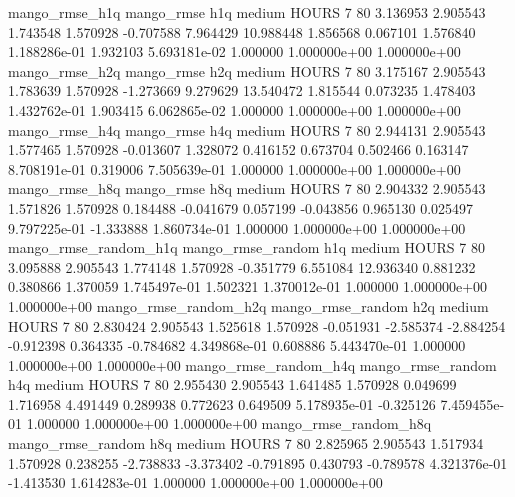        mango_rmse_h1q        mango_rmse                  h1q     medium    HOURS                 7 80  3.136953       2.905543 1.743548       1.570928   -0.707588      7.964429     10.988448     1.856568       0.067101  1.576840 1.188286e-01     1.932103   5.693181e-02            1.000000    1.000000e+00        1.000000e+00
       mango_rmse_h2q        mango_rmse                  h2q     medium    HOURS                 7 80  3.175167       2.905543 1.783639       1.570928   -1.273669      9.279629     13.540472     1.815544       0.073235  1.478403 1.432762e-01     1.903415   6.062865e-02            1.000000    1.000000e+00        1.000000e+00
       mango_rmse_h4q        mango_rmse                  h4q     medium    HOURS                 7 80  2.944131       2.905543 1.577465       1.570928   -0.013607      1.328072      0.416152     0.673704       0.502466  0.163147 8.708191e-01     0.319006   7.505639e-01            1.000000    1.000000e+00        1.000000e+00
       mango_rmse_h8q        mango_rmse                  h8q     medium    HOURS                 7 80  2.904332       2.905543 1.571826       1.570928    0.184488     -0.041679      0.057199    -0.043856       0.965130  0.025497 9.797225e-01    -1.333888   1.860734e-01            1.000000    1.000000e+00        1.000000e+00
mango_rmse_random_h1q mango_rmse_random                  h1q     medium    HOURS                 7 80  3.095888       2.905543 1.774148       1.570928   -0.351779      6.551084     12.936340     0.881232       0.380866  1.370059 1.745497e-01     1.502321   1.370012e-01            1.000000    1.000000e+00        1.000000e+00
mango_rmse_random_h2q mango_rmse_random                  h2q     medium    HOURS                 7 80  2.830424       2.905543 1.525618       1.570928   -0.051931     -2.585374     -2.884254    -0.912398       0.364335 -0.784682 4.349868e-01     0.608886   5.443470e-01            1.000000    1.000000e+00        1.000000e+00
mango_rmse_random_h4q mango_rmse_random                  h4q     medium    HOURS                 7 80  2.955430       2.905543 1.641485       1.570928    0.049699      1.716958      4.491449     0.289938       0.772623  0.649509 5.178935e-01    -0.325126   7.459455e-01            1.000000    1.000000e+00        1.000000e+00
mango_rmse_random_h8q mango_rmse_random                  h8q     medium    HOURS                 7 80  2.825965       2.905543 1.517934       1.570928    0.238255     -2.738833     -3.373402    -0.791895       0.430793 -0.789578 4.321376e-01    -1.413530   1.614283e-01            1.000000    1.000000e+00        1.000000e+00
